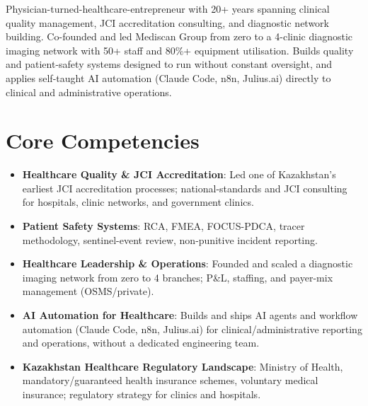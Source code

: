 \documentclass[11pt,a4paper,sans]{moderncv}
\begin{document}
\makecvtitle


\vspace{6pt}
\small{Physician-turned-healthcare-entrepreneur with 20+ years spanning clinical quality management, JCI accreditation consulting, and diagnostic network building. Co-founded and led Mediscan Group from zero to a 4-clinic diagnostic imaging network with 50+ staff and 80\%+ equipment utilisation. Builds quality and patient-safety systems designed to run without constant oversight, and applies self-taught AI automation (Claude Code, n8n, Julius.ai) directly to clinical and administrative operations.}


\section{Core Competencies}
\vspace{1pt}
\begin{itemize}

\item \textbf{Healthcare Quality \& JCI Accreditation}: Led one of Kazakhstan's earliest JCI accreditation processes; national-standards and JCI consulting for hospitals, clinic networks, and government clinics.

\item \textbf{Patient Safety Systems}: RCA, FMEA, FOCUS-PDCA, tracer methodology, sentinel-event review, non-punitive incident reporting.

\item \textbf{Healthcare Leadership \& Operations}: Founded and scaled a diagnostic imaging network from zero to 4 branches; P\&L, staffing, and payer-mix management (OSMS/private).

\item \textbf{AI Automation for Healthcare}: Builds and ships AI agents and workflow automation (Claude Code, n8n, Julius.ai) for clinical/administrative reporting and operations, without a dedicated engineering team.

\item \textbf{Kazakhstan Healthcare Regulatory Landscape}: Ministry of Health, mandatory/guaranteed health insurance schemes, voluntary medical insurance; regulatory strategy for clinics and hospitals.

\end{itemize}
\end{document}
